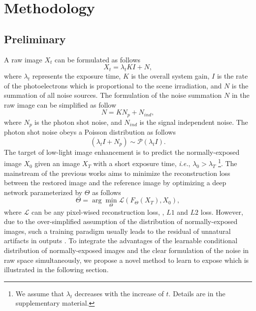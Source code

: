 \documentclass[10pt,twocolumn,letterpaper]{article}
\def\ie{\textit{i.e.}}
\begin{document}
\section{Methodology}
\vspace{-0.1cm}
\subsection{Preliminary}
\vspace{-0.1cm}
A raw image $X_t$ can be formulated as follows
\begin{equation}
    X_t = \lambda_t K I + N,
\label{eq:raw_img}
\end{equation}
where $\lambda_t$ represents the exposure time, $K$ is the overall system gain, $I$ is the rate of the photoelectrons which is proportional to the scene irradiation, and $N$ is the summation of all noise sources. 
The formulation of the noise summation $N$ in the raw image can be simplified as follow
\begin{equation}
    N = K N_p + N_{ind},
\label{eq:noise_model}
\end{equation}
where $N_p$ is the photon shot noise, and $N_{ind}$ is the signal independent noise. The photon shot noise obeys a Poisson distribution as follows
\begin{equation}
    (\lambda_t I+N_p) \sim \mathcal{P}(\lambda_t I).
\end{equation}
The target of low-light image enhancement is to predict the normally-exposed image $X_{0}$ given an image $X_T$ with a short exposure time, \ie, $\lambda_{0}>\lambda_{T}$ \footnote{We assume that $\lambda_t$ decreases with the increase of $t$. Details are in the supplementary material.}. 
The mainstream of the previous works aims to minimize the reconstruction loss between the restored image and the reference image by optimizing a deep network parameterized by $\Theta$ as follows
\begin{equation}
    \Theta = \arg \min_\Theta \mathcal{L}(F_{\Theta} (X_T), X_{0}),
\end{equation}
where $\mathcal{L}$ can be any pixel-wised reconstruction loss, \eg, $L1$ and $L2$ loss. 
However, due to the over-simplified assumption of the distribution of normally-exposed images, such a training paradigm usually leads to the residual of unnatural artifacts in outputs \cite{wang2021low}. To integrate the advantages of the learnable conditional distribution of normally-exposed images and the clear formulation of the noise in raw space simultaneously, we propose a novel method to learn to expose which is illustrated in the following section.
\end{document}
